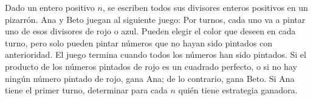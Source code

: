 Dado un entero positivo $n$, se escriben todos sus divisores enteros positivos en un pizarrón. Ana y Beto juegan al siguiente juego: \newline 
Por turnos, cada uno va a pintar uno de esos divisores de rojo o azul. Pueden elegir el color que deseen en cada turno, pero solo pueden pintar números que no hayan sido pintados con anterioridad. El juego termina cuando todos los números han sido pintados. Si el producto de los números pintados de rojo es un cuadrado perfecto, o si no hay ningún número pintado de rojo, gana Ana; de lo contrario, gana Beto. Si Ana tiene el primer turno, determinar para cada $n$ quién tiene estrategia ganadora.
